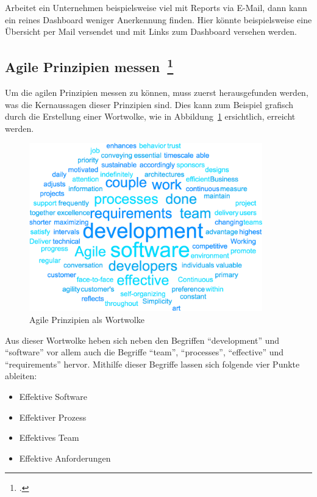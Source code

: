 Arbeitet ein Unternehmen beispielsweise viel mit Reports via E-Mail, dann kann ein reines Dashboard weniger Anerkennung finden. Hier könnte beispielsweise eine Übersicht per Mail versendet und mit Links zum Dashboard versehen werden.

\subsection[Agile Prinzipien messen]{Agile Prinzipien messen~\footcite[vgl.][S.201ff]{davis_agile_2015}}

Um die agilen Prinzipien messen zu können, muss zuerst herausgefunden werden, was die Kernaussagen dieser Prinzipien sind.
Dies kann zum Beispiel grafisch durch die Erstellung einer Wortwolke, wie in Abbildung~\ref{fig:wordcloud_principles} ersichtlich, erreicht werden.

\begin{savenotes}
  \begin{figure}[H] 
    \centering
    \includegraphics[width=0.9\textwidth]{img/principles-wordcloud.png}
    \caption{Agile Prinzipien als Wortwolke}\label{fig:wordcloud_principles}
  \end{figure}
\end{savenotes}

Aus dieser Wortwolke heben sich neben den Begriffen ``development'' und ``software'' vor allem auch die Begriffe ``team'', ``processes'', ``effective'' und ``requirements'' hervor.
Mithilfe dieser Begriffe lassen sich folgende vier Punkte ableiten:

\begin{itemize}[noitemsep]
  \item Effektive Software
  \item Effektiver Prozess
  \item Effektives Team 
  \item Effektive Anforderungen 
\end{itemize}

